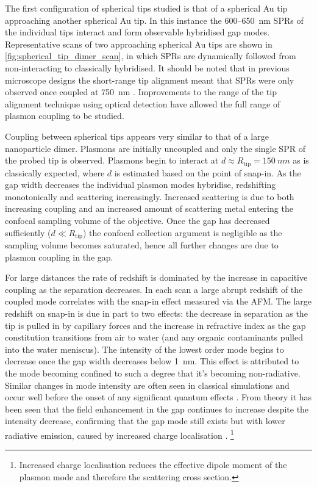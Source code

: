 \documentclass[a4paper]{article}
\begin{document}
The first configuration of spherical tips studied is that of a spherical Au tip approaching another spherical Au tip. In this instance the 600--\SI{650}{nm} SPRs of the individual tips interact and form observable hybridised gap modes. Representative scans of two approaching spherical Au tips are shown in \autoref{fig:spherical_tip_dimer_scan}, in which SPRs are dynamically followed from non-interacting to classically hybridised. It should be noted that in previous microscope designs the short-range tip alignment meant that SPRs were only observed once coupled at \SI{750}{nm} \cite{savage2012}. Improvements to the range of the tip alignment technique using optical detection have allowed the full range of plasmon coupling to be studied.

Coupling between spherical tips appears very similar to that of a large nanoparticle dimer. Plasmons are initially uncoupled and only the single SPR of the probed tip is observed. Plasmons begin to interact at $d \approx R_{\mathrm{tip}} = \SI{150}{nm}$ as is classically expected, where $d$ is estimated based on the point of snap-in. As the gap width decreases the individual plasmon modes hybridise, redshifting monotonically and scattering increasingly. Increased scattering is due to both increasing coupling and an increased amount of scattering metal entering the confocal sampling volume of the objective. Once the gap has decreased sufficiently ($d \ll R_{\mathrm{tip}}$) the confocal collection argument is negligible as the sampling volume becomes saturated, hence all further changes are due to plasmon coupling in the gap.

For large distances the rate of redshift is dominated by the increase in capacitive coupling as the separation decreases. In each scan a large abrupt redshift of the coupled mode correlates with the snap-in effect measured via the AFM. The large redshift on snap-in is due in part to two effects: the decrease in separation as the tip is pulled in by capillary forces and the increase in refractive index as the gap constitution transitions from air to water (and any organic contaminants pulled into the water meniscus). The intensity of the lowest order mode begins to decrease once the gap width decreases below \SI{1}{nm}. This effect is attributed to the mode becoming confined to such a degree that it's becoming non-radiative. Similar changes in mode intensity are often seen in classical simulations and occur well before the onset of any significant quantum effects \cite{savage2012, esteban2015}.
{\color{red}From theory it has been seen that the field enhancement in the gap continues to increase despite the intensity decrease, confirming that the gap mode still exists but with lower radiative emission, caused by increased charge localisation \cite{esteban2012}.%
\footnote{Increased charge localisation reduces the effective dipole moment of the plasmon mode and therefore the scattering cross section.}}
\end{document}
